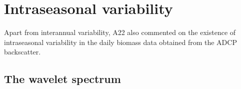 \documentclass[authoryear,review,11pt]{elsarticle}
\begin{document}

\section{Intraseasonal variability}
\label{sec:intraseasonal}

Apart from interannual variability, A22 also commented on the existence of intraseasonal variability in the daily biomass data obtained from the ADCP backscatter. 

\subsection{The wavelet spectrum}
\label{sec:intraseasonal.wavelet}
\end{document}
